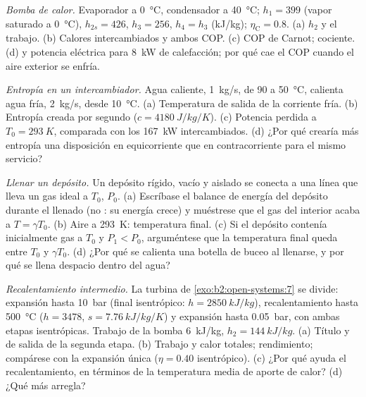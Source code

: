 \begin{exercise}[$\star\star$]\label{exo:b2:open-systems:8}
\emph{Bomba de calor.} Evaporador a \qty{0}{\celsius}, condensador a \qty{40}{\celsius};
$h_1 = 399$ (vapor saturado a \qty{0}{\celsius}), $h_{2s} = 426$, $h_3 = 256$,
$h_4 = h_3$ (\unit{kJ/kg}); $\eta_{\text{C}} = 0.8$. (a) $h_2$ y el trabajo.
(b) Calores intercambiados y ambos COP. (c) COP de Carnot; cociente. (d) 
y potencia eléctrica para \qty{8}{kW} de calefacción; por qué cae el COP cuando
el aire exterior se enfría.
\end{exercise}

\begin{exercise}[$\star\star$]\label{exo:b2:open-systems:9}
\emph{Entropía en un intercambiador.} Agua caliente, \qty{1}{kg/s}, de \qty{90}{} a
\qty{50}{\celsius}, calienta agua fría, \qty{2}{kg/s}, desde \qty{10}{\celsius}.
(a) Temperatura de salida de la corriente fría. (b) Entropía creada por
segundo ($c = \qty{4180}{J/kg/K}$). (c) Potencia perdida a $T_0 = \qty{293}{K}$,
comparada con los \qty{167}{kW} intercambiados. (d) ¿Por qué crearía más entropía una
disposición en equicorriente que en contracorriente para el mismo servicio?
\end{exercise}

\begin{exercise}[$\star\star\star$]\label{exo:b2:open-systems:10}
\emph{Llenar un depósito.} Un depósito rígido, vacío y aislado se conecta
a una línea que lleva un gas ideal a $T_0$, $P_0$. (a) Escríbase el balance de energía
del depósito durante el llenado (no : su energía crece) y
muéstrese que el gas del interior acaba a $T = \gamma T_0$. (b) Aire a \qty{293}{K}:
temperatura final. (c) Si el depósito contenía inicialmente gas a $T_0$ y
$P_1 < P_0$, arguméntese que la temperatura final queda entre $T_0$ y
$\gamma T_0$. (d) ¿Por qué se calienta una botella de buceo al llenarse, y por qué
se llena despacio dentro del agua?
\end{exercise}

\begin{exercise}[$\star\star\star$]\label{exo:b2:open-systems:11}
\emph{Recalentamiento intermedio.} La turbina de \cref{exo:b2:open-systems:7} se divide:
expansión hasta \qty{10}{bar} (final isentrópico: $h = \qty{2850}{kJ/kg}$), recalentamiento
hasta \qty{500}{\celsius} ($h = 3478$, $s = \qty{7.76}{kJ/kg/K}$) y expansión hasta
\qty{0.05}{bar}, con ambas etapas isentrópicas. Trabajo de la bomba \qty{6}{kJ/kg}, $h_2 =
\qty{144}{kJ/kg}$. (a) Título y  de salida de la segunda etapa. (b)
Trabajo y calor totales; rendimiento; compárese con la expansión única
($\eta = 0.40$ isentrópico). (c) ¿Por qué ayuda el recalentamiento, en términos de la
temperatura media de aporte de calor? (d) ¿Qué más arregla?
\end{exercise}

